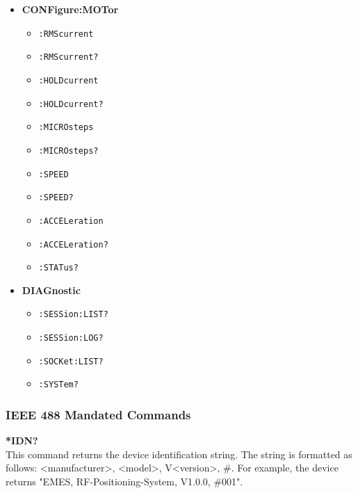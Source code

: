 \begin{itemize}[label={}]
    \vspace{-0.25em}
    \begin{itemize}[label={}]
        \item \texttt{:STEP\#}
        \item \texttt{:PERPetual\#}
        \item \texttt{:DIRection\#}
        \item \texttt{:DIRection\#?}
        \item \texttt{:RELative\#}
        \item \texttt{:ABSolute\#}
        \item \texttt{:ABSolute\#?}
    \end{itemize}
    \vspace{-0.25em}
    \item \textbf{CONFigure:MOTor}
    \vspace{-0.25em}
    \begin{itemize}[label={}]
        \item \texttt{:RMScurrent}
        \item \texttt{:RMScurrent?}
        \item \texttt{:HOLDcurrent}
        \item \texttt{:HOLDcurrent?}
        \item \texttt{:MICROsteps}
        \item \texttt{:MICROsteps?}
        \item \texttt{:SPEED}
        \item \texttt{:SPEED?}
        \item \texttt{:ACCELeration}
        \item \texttt{:ACCELeration?}
        \item \texttt{:STATus?}
    \end{itemize}
    \vspace{-0.25em}
    \item \textbf{DIAGnostic}
    \vspace{-0.25em}
    \begin{itemize}[label={}]
        \item \texttt{:SESSion:LIST?}
        \item \texttt{:SESSion:LOG?}
        \item \texttt{:SOCKet:LIST?}
        \item \texttt{:SYSTem?}
    \end{itemize}
\end{itemize}

\subsubsection{IEEE 488 Mandated Commands}
\textbf{*IDN?} \\
This command returns the device identification string. The string is formatted as follows: <manufacturer>, <model>, V<version>, \#<serial number>. For example, the device returns "EMES, RF-Positioning-System, V1.0.0, \#001".

